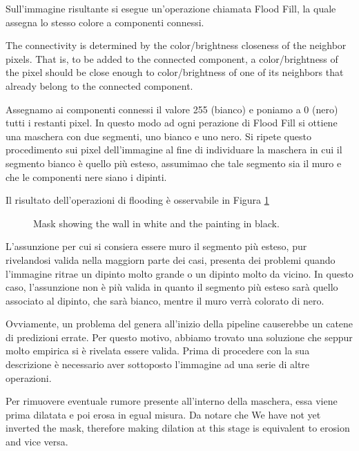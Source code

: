 \documentclass[10pt,twocolumn,letterpaper]{article}
\begin{document}
Sull'immagine risultante si esegue un'operazione chiamata Flood Fill, la quale assegna lo stesso colore a componenti connessi. 

The connectivity is determined by the color/brightness closeness of the neighbor pixels. That is, to be added to the connected component, a color/brightness of the pixel should be close enough to color/brightness of one of its neighbors that already belong to the connected component.

Assegnamo ai componenti connessi il valore 255 (bianco) e poniamo a 0 (nero) tutti i restanti pixel. In questo modo ad ogni perazione di Flood Fill si ottiene una maschera con due segmenti, uno bianco e uno nero. Si ripete questo procedimento sui pixel dell'immagine al fine di individuare la maschera in cui il segmento bianco è quello più esteso, assumimao che tale segmento sia il muro e che le componenti nere siano i dipinti.
 
Il risultato dell'operazioni di flooding è osservabile in Figura \ref{fig:maskLargestSegment} 

\begin{figure}[t]
   \begin{center}
   \fbox{\rule{0pt}{2in} \rule{0.9\linewidth}{0pt}}
   \end{center}
      \caption{Mask showing the wall in white and the painting in black.}
   \label{fig:maskLargestSegment}
\end{figure}

L'assunzione per cui si consiera essere muro il segmento più esteso, pur rivelandosi valida nella maggiorn parte dei casi, presenta dei problemi quando l'immagine ritrae un dipinto molto grande o un dipinto molto da vicino. In questo caso, l'assunzione non è più valida in quanto il segmento più esteso sarà quello associato al dipinto, che sarà bianco, mentre il muro verrà colorato di nero. 

Ovviamente, un problema del genera all'inizio della pipeline causerebbe un catene di predizioni errate. Per questo motivo, abbiamo trovato una soluzione che seppur molto empirica si è rivelata essere valida. Prima di procedere con la sua descrizione è necessario aver sottoposto l'immagine ad una serie di altre operazioni. 

Per rimuovere eventuale rumore presente all'interno della maschera, essa viene prima dilatata e poi erosa in egual misura. Da notare che We have not yet inverted the mask, therefore making dilation at this stage is equivalent to erosion and vice versa.
\end{document}
